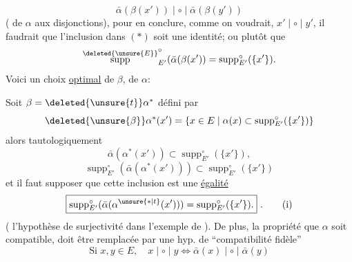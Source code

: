 \[
\bar\alpha(\beta(x'))\mid\circ\mid\bar\alpha(\beta(y'))
\]
( de $\alpha$ aux disjonctions), pour en conclure, comme on voudrait, $x'\mid\circ\mid y'$, il faudrait que l'inclusion dans $(*)$ soit une identité; ou plutôt que
\[
\overset{\deleted{\unsure{E}}}{\operatorname{supp}}^{\circ}_{E'}(\bar\alpha(\beta(x'))=\operatorname{supp}^{\circ}_{E'}(\{x'\}) .
\]
Voici un choix \uline{optimal} de $\beta$,  de $\alpha$:

Soit $\beta=\deleted{\unsure{t}}\alpha^*$ défini par
\[
\deleted{\unsure{\beta}}\alpha^*(x')=\{x\in E\mid\alpha(x)\subset\operatorname{supp}^{\circ}_{E'}(\{x'\})\}
\]
 alors tautologiquement
\[
\bar\alpha(\alpha^*(x'))\subset\operatorname{supp}^{\circ}_{E'}(\{x'\}),
\]
\[
\operatorname{supp}^{\circ}_{E'}(\bar\alpha(\alpha^*(x')))\subset\operatorname{supp}^{\circ}_{E'}(\{x'\})
\]
et il faut supposer que cette inclusion est une \uline{égalité}
\[
\boxed{\operatorname{supp}^{\circ}_{E'}(\bar\alpha(\alpha^{\unsure{*|t}}(x')))=\operatorname{supp}^{\circ}_{E'}(\{x'\}).}\ .\tag*{(i)}
\]
( l'hypothèse de surjectivité dans l'exemple de ). De plus, la propriété que $\alpha$ soit compatible, doit être remplacée par une hyp. de ``compatibilité fidèle''
\[
\boxed{\text{Si }x,y\in E,\quad x\mid\circ\mid y\Longleftrightarrow\bar\alpha(x)\mid\circ\mid\bar\alpha(y)}\tag*{(ii)}
\]
